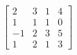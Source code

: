 %
\begin{equation*}
\begin{bmatrix}
2 & 3 & 1 & 4\\ 
1 & 1 & 1 & 0\\ 
-1 & 2 & 3 & 5\\ 
1 & 2 & 1 & 3
\end{bmatrix}
\end{equation*}

